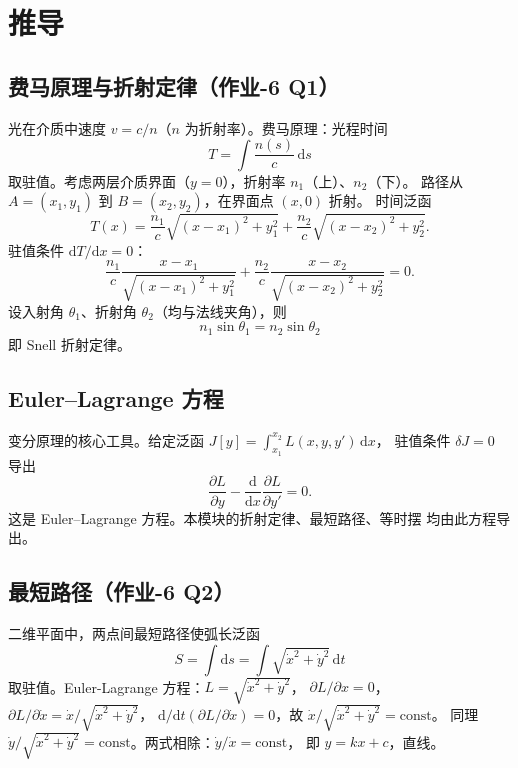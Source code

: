 \documentclass[UTF8,a4paper,11pt]{ctexart}
\begin{document}
\section{推导}
\label{sec:derive}

\subsection{费马原理与折射定律（作业-6 Q1）}
\label{sub:fermat}

光在介质中速度 $v=c/n$（$n$ 为折射率）。费马原理：光程时间
\begin{equation}
  T=\int \frac{n(s)}{c}\,\mathrm ds
\end{equation}
取驻值。考虑两层介质界面（$y=0$），折射率 $n_1$（上）、$n_2$（下）。
路径从 $A=(x_1,y_1)$ 到 $B=(x_2,y_2)$，在界面点 $(x,0)$ 折射。
时间泛函
\begin{equation}
  T(x)=\frac{n_1}{c}\sqrt{(x-x_1)^2+y_1^2}
  +\frac{n_2}{c}\sqrt{(x-x_2)^2+y_2^2}.
\end{equation}
驻值条件 $\mathrm dT/\mathrm dx=0$：
\begin{equation}
  \frac{n_1}{c}\frac{x-x_1}{\sqrt{(x-x_1)^2+y_1^2}}
  +\frac{n_2}{c}\frac{x-x_2}{\sqrt{(x-x_2)^2+y_2^2}}=0.
\end{equation}
设入射角 $\theta_1$、折射角 $\theta_2$（均与法线夹角），则
\begin{equation}
  \boxed{\;n_1\sin\theta_1=n_2\sin\theta_2\;}
\end{equation}
即 Snell 折射定律。

\subsection{Euler--Lagrange 方程}
\label{sub:euler-lagrange}

变分原理的核心工具。给定泛函 $J[y]=\int_{x_1}^{x_2} L(x,y,y')\,\mathrm dx$，
驻值条件 $\delta J=0$ 导出
\begin{equation}
  \frac{\partial L}{\partial y}-\frac{\mathrm d}{\mathrm dx}\frac{\partial L}{\partial y'}=0.
\end{equation}
这是 Euler--Lagrange 方程。本模块的折射定律、最短路径、等时摆
均由此方程导出。

\subsection{最短路径（作业-6 Q2）}
\label{sub:shortest}

二维平面中，两点间最短路径使弧长泛函
\begin{equation}
  S=\int \mathrm ds=\int\sqrt{\dot x^2+\dot y^2}\,\mathrm dt
\end{equation}
取驻值。Euler-Lagrange 方程：$L=\sqrt{\dot x^2+\dot y^2}$，
$\partial L/\partial x=0$，$\partial L/\partial\dot x=\dot x/\sqrt{\dot x^2+\dot y^2}$，
$\mathrm d/\mathrm dt(\partial L/\partial\dot x)=0$，故 $\dot x/\sqrt{\dot x^2+\dot y^2}=\mathrm{const}$。
同理 $\dot y/\sqrt{\dot x^2+\dot y^2}=\mathrm{const}$。两式相除：$\dot y/\dot x=\mathrm{const}$，
即 $y=kx+c$，直线。
\end{document}
